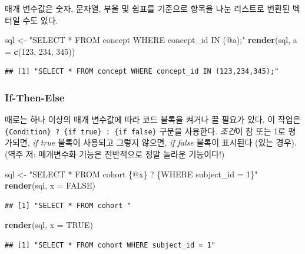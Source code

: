 \documentclass[10.5pt]{book}
\newenvironment{Shaded}{\begin{snugshade}}{\end{snugshade}}
\newcommand{\KeywordTok}[1]{\textcolor[rgb]{0.13,0.29,0.53}{\textbf{#1}}}
\newcommand{\DataTypeTok}[1]{\textcolor[rgb]{0.13,0.29,0.53}{#1}}
\newcommand{\DecValTok}[1]{\textcolor[rgb]{0.00,0.00,0.81}{#1}}
\newcommand{\StringTok}[1]{\textcolor[rgb]{0.31,0.60,0.02}{#1}}
\newcommand{\OtherTok}[1]{\textcolor[rgb]{0.56,0.35,0.01}{#1}}
\newcommand{\NormalTok}[1]{#1}
\theoremstyle{definition}
\theoremstyle{definition}
\theoremstyle{definition}
\theoremstyle{remark}
\begin{document}
매개 변수값은 숫자, 문자열, 부울 및 쉼표를 기준으로 항목을 나눈 리스트로
변환된 벡터일 수도 있다.

\begin{Shaded}
\begin{Highlighting}[]
\NormalTok{sql <-}\StringTok{ "SELECT * FROM concept WHERE concept_id IN (@a);"}
\KeywordTok{render}\NormalTok{(sql, }\DataTypeTok{a =} \KeywordTok{c}\NormalTok{(}\DecValTok{123}\NormalTok{, }\DecValTok{234}\NormalTok{, }\DecValTok{345}\NormalTok{))}
\end{Highlighting}
\end{Shaded}

\begin{verbatim}
## [1] "SELECT * FROM concept WHERE concept_id IN (123,234,345);"
\end{verbatim}

\subsubsection*{If-Then-Else}\label{if-then-else}

때로는 하나 이상의 매개 변수값에 따라 코드 블록을 켜거나 끌 필요가 있다.
이 작업은 \texttt{\{Condition\}\ ?\ \{if\ true\}\ :\ \{if\ false\}}
구문을 사용한다. \emph{조건}이 참 또는 1로 평가되면, \emph{if true}
블록이 사용되고 그렇지 않으면, \emph{if false} 블록이 표시된다 (있는
경우). (역주 저: 매개변수화 기능은 전반적으로 정말 놀라운 기능이다!)

\begin{Shaded}
\begin{Highlighting}[]
\NormalTok{sql <-}\StringTok{ "SELECT * FROM cohort \{@x\} ? \{WHERE subject_id = 1\}"}
\KeywordTok{render}\NormalTok{(sql, }\DataTypeTok{x =} \OtherTok{FALSE}\NormalTok{)}
\end{Highlighting}
\end{Shaded}

\begin{verbatim}
## [1] "SELECT * FROM cohort "
\end{verbatim}

\begin{Shaded}
\begin{Highlighting}[]
\KeywordTok{render}\NormalTok{(sql, }\DataTypeTok{x =} \OtherTok{TRUE}\NormalTok{)}
\end{Highlighting}
\end{Shaded}

\begin{verbatim}
## [1] "SELECT * FROM cohort WHERE subject_id = 1"
\end{verbatim}
\end{document}
